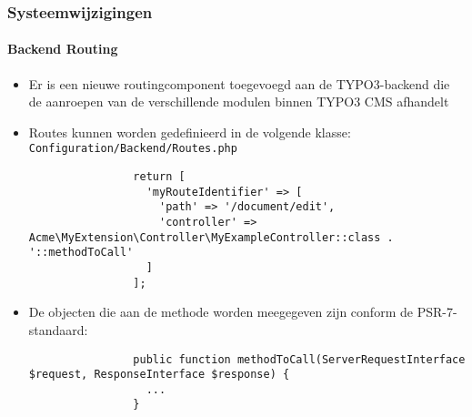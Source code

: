 \begin{frame}[fragile]
	\frametitle{Systeemwijzigingen}
	\framesubtitle{Backend Routing}

	\lstset{basicstyle=\tiny\ttfamily}

	\begin{itemize}

		\item Er is een nieuwe routingcomponent toegevoegd aan de TYPO3-backend die de aanroepen van de verschillende modulen binnen TYPO3 CMS afhandelt

		\item Routes kunnen worden gedefinieerd in de volgende klasse:\newline
			\small
				\texttt{Configuration/Backend/Routes.php}
			\normalsize

			\begin{lstlisting}
				return [
				  'myRouteIdentifier' => [
				    'path' => '/document/edit',
				    'controller' => Acme\MyExtension\Controller\MyExampleController::class . '::methodToCall'
				  ]
				];
			\end{lstlisting}

		\item De objecten die aan de methode worden meegegeven zijn conform de PSR-7-standaard:

			\begin{lstlisting}
				public function methodToCall(ServerRequestInterface $request, ResponseInterface $response) {
				  ...
				}
			\end{lstlisting}

	\end{itemize}

\end{frame}


